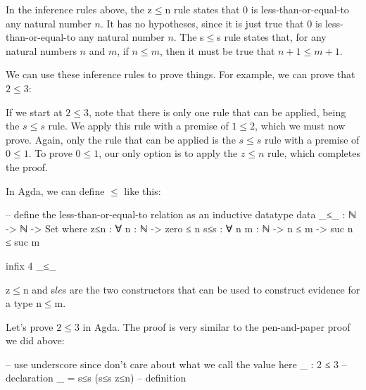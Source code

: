\documentclass{lecturenotes}
\begin{document}

In the inference rules above, the z$\le$n rule states that $0$ is less-than-or-equal-to any natural number $n$.
It has no hypotheses, since it is just true that $0$ is less-than-or-equal-to any natural number $n$.
The s$\le$s rule states that, for any natural numbers $n$ and $m$, if $n \le m$, then it must be true that $n + 1 \le m + 1$.

We can use these inference rules to prove things.
For example, we can prove that $2 \le 3$:

\begin{mathpar}
\end{mathpar}

If we start at $2 \le 3$, note that there is only one rule that can be applied, being the $s\le s$ rule.
We apply this rule with a premise of $1 \le 2$, which we must now prove.
Again, only the rule that can be applied is the $s\le s$ rule with a premise of $0 \le 1$.
To prove $0 \le 1$, our only option is to apply the $z\le n$ rule, which completes the proof.

In Agda, we can define $\le$ like this:

\begin{center}
\begin{code}
-- define the less-than-or-equal-to relation as an inductive datatype
data _≤_ : ℕ -> ℕ -> Set where
  z≤n : ∀ {n : ℕ} ->
        zero ≤ n
  s≤s : ∀ {n m : ℕ} ->
        n ≤ m ->
        suc n ≤ suc m

infix 4 _≤_
\end{code}
\end{center}

z$\le$n and s$le$s are the two constructors that can be used to construct evidence for a type n$\le$m.

Let's prove $2 \le 3$ in Agda.
The proof is very similar to the pen-and-paper proof we did above:

\begin{center}
\begin{code}
-- use underscore since don't care about what we call the value here
_ : 2 ≤ 3 -- declaration
_ = s≤s (s≤s z≤n) -- definition
\end{code}
\end{center}
\end{document}

